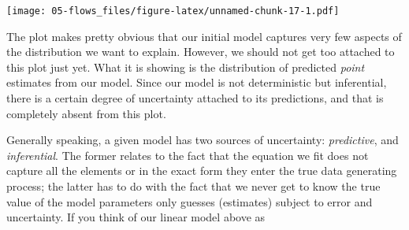 \documentclass[
]{book}
\newenvironment{Shaded}{\begin{snugshade}}{\end{snugshade}}
\newcommand{\AttributeTok}[1]{\textcolor[rgb]{0.77,0.63,0.00}{#1}}
\newcommand{\DecValTok}[1]{\textcolor[rgb]{0.00,0.00,0.81}{#1}}
\newcommand{\FunctionTok}[1]{\textcolor[rgb]{0.00,0.00,0.00}{#1}}
\newcommand{\NormalTok}[1]{#1}
\newcommand{\SpecialCharTok}[1]{\textcolor[rgb]{0.00,0.00,0.00}{#1}}
\newcommand{\StringTok}[1]{\textcolor[rgb]{0.31,0.60,0.02}{#1}}
\begin{document}
\begin{Shaded}
\end{Shaded}

\texttt{[image: 05-flows\_files/figure-latex/unnamed-chunk-17-1.pdf]}

The plot makes pretty obvious that our initial model captures very few aspects of the distribution we want to explain. However, we should not get too attached to this plot just yet. What it is showing is the distribution of predicted \emph{point} estimates from our model. Since our model is not deterministic but inferential, there is a certain degree of uncertainty attached to its predictions, and that is completely absent from this plot.

Generally speaking, a given model has two sources of uncertainty: \emph{predictive}, and \emph{inferential}. The former relates to the fact that the equation we fit does not capture all the elements or in the exact form they enter the true data generating process; the latter has to do with the fact that we never get to know the true value of the model parameters only guesses (estimates) subject to error and uncertainty. If you think of our linear model above as
\end{document}
